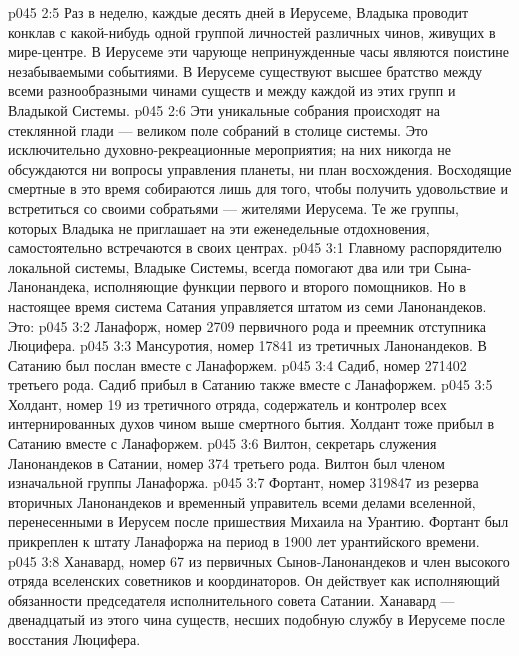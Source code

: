 \vs p045 2:5 Раз в неделю, каждые десять дней в Иерусеме, Владыка проводит конклав с какой\hyp{}нибудь одной группой личностей различных чинов, живущих в мире\hyp{}центре. В Иерусеме эти чарующе непринужденные часы являются поистине незабываемыми событиями. В Иерусеме существуют высшее братство между всеми разнообразными чинами существ и между каждой из этих групп и Владыкой Системы.
\vs p045 2:6 Эти уникальные собрания происходят на стеклянной глади --- великом поле собраний в столице системы. Это исключительно духовно\hyp{}рекреационные мероприятия; на них никогда не обсуждаются ни вопросы управления планеты, ни план восхождения. Восходящие смертные в это время собираются лишь для того, чтобы получить удовольствие и встретиться со своими собратьями --- жителями Иерусема. Те же группы, которых Владыка не приглашает на эти еженедельные отдохновения, самостоятельно встречаются в своих центрах.
\vs p045 3:1 Главному распорядителю локальной системы, Владыке Системы, всегда помогают два или три Сына\hyp{}Ланонандека, исполняющие функции первого и второго помощников. Но в настоящее время система Сатания управляется штатом из семи Ланонандеков. Это:
\vs p045 3:2 \bibnobreakspace {} Ланафорж, номер 2709 первичного рода и преемник отступника Люцифера.
\vs p045 3:3 \pc {}\bibnobreakspace {} Мансуротия, номер 17841 из третичных Ланонандеков. В Сатанию был послан вместе с Ланафоржем.
\vs p045 3:4 \pc {}\bibnobreakspace {} Садиб, номер 271402 третьего рода. Садиб прибыл в Сатанию также вместе с Ланафоржем.
\vs p045 3:5 \pc {}\bibnobreakspace {} Холдант, номер 19 из третичного отряда, содержатель и контролер всех интернированных духов чином выше смертного бытия. Холдант тоже прибыл в Сатанию вместе с Ланафоржем.
\vs p045 3:6 \pc {}\bibnobreakspace {} Вилтон, секретарь служения Ланонандеков в Сатании, номер 374 третьего рода. Вилтон был членом изначальной группы Ланафоржа.
\vs p045 3:7 \pc {}\bibnobreakspace {} Фортант, номер 319847 из резерва вторичных Ланонандеков и временный управитель всеми делами вселенной, перенесенными в Иерусем после пришествия Михаила на Урантию. Фортант был прикреплен к штату Ланафоржа на период в 1900 лет урантийского времени.
\vs p045 3:8 \pc {}\bibnobreakspace {} Ханавард, номер 67 из первичных Сынов\hyp{}Ланонандеков и член высокого отряда вселенских советников и координаторов. Он действует как исполняющий обязанности председателя исполнительного совета Сатании. Ханавард --- двенадцатый из этого чина существ, несших подобную службу в Иерусеме после восстания Люцифера.
